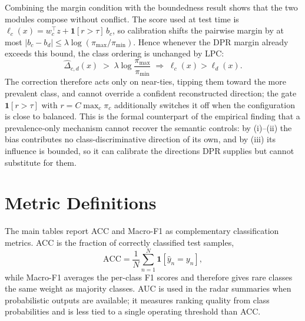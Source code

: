 \documentclass[letterpaper]{article}
\theoremstyle{definition}
\theoremstyle{plain}
\begin{document}
Combining the margin condition with the boundedness result shows that the two modules compose without conflict. The score used at test time is \(\ell_c(x)=w_c^{\top}z+\mathbf{1}[r>\tau]\,b_c\), so calibration shifts the pairwise margin by at most \(|b_c-b_d|\le\lambda\log(\pi_{\max}/\pi_{\min})\). Hence whenever the DPR margin already exceeds this bound, the class ordering is unchanged by LPC:
\begin{equation}
\widehat{\Delta}_{c,d}(x)\;>\;\lambda\log\frac{\pi_{\max}}{\pi_{\min}}
\;\Longrightarrow\;
\ell_c(x)>\ell_d(x).
\end{equation}
The correction therefore acts only on near-ties, tipping them toward the more prevalent class, and cannot override a confident reconstructed direction; the gate $\mathbf{1}[r>\tau]$ with $r=C\max_c\pi_c$ additionally switches it off when the configuration is close to balanced. This is the formal counterpart of the empirical finding that a prevalence-only mechanism cannot recover the semantic controls: by (i)--(ii) the bias contributes no class-discriminative direction of its own, and by (iii) its influence is bounded, so it can calibrate the directions DPR supplies but cannot substitute for them.

\section{Metric Definitions}
\label{app:metric-geometry}

The main tables report ACC and Macro-F1 as complementary classification metrics. ACC is the fraction of correctly classified test samples,
\begin{equation}
\mathrm{ACC}=\frac{1}{N}\sum_{n=1}^{N}\mathbf{1}[\hat{y}_n=y_n],
\end{equation}
while Macro-F1 averages the per-class F1 scores and therefore gives rare classes the same weight as majority classes. AUC is used in the radar summaries when probabilistic outputs are available; it measures ranking quality from class probabilities and is less tied to a single operating threshold than ACC.
\end{document}
